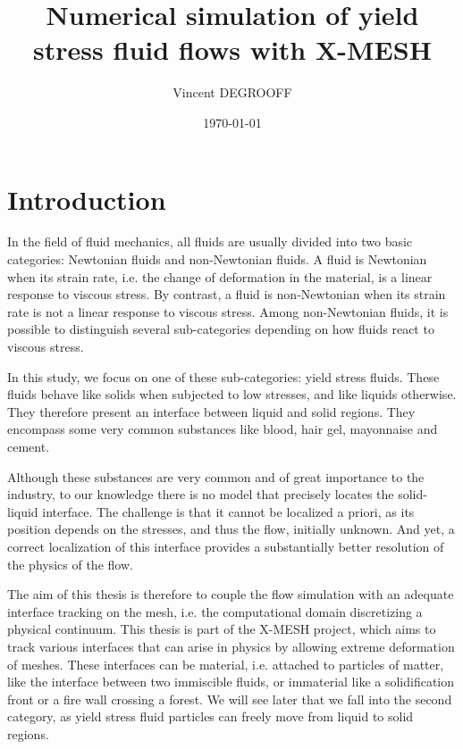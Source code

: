 \documentclass[11 pt]{report}
\title{{\Huge Numerical simulation of yield stress fluid flows with X-MESH}}
\author{Vincent \textsc{DEGROOFF}}
\date{\today}
\begin{document}
 


\setcounter{tocdepth}{1}
\tableofcontents
\setcounter{page}{1}





\clearpage
{}
\chapter*{Introduction}
In the field of fluid mechanics, all fluids are usually divided into two basic categories: Newtonian fluids and non-Newtonian fluids. A fluid is Newtonian when its strain rate, i.e. the change of deformation in the material, is a linear response to viscous stress. By contrast, a fluid is non-Newtonian when its strain rate is not a linear response to viscous stress. Among non-Newtonian fluids, it is possible to distinguish several sub-categories depending on how fluids react to viscous stress.

In this study, we focus on one of these sub-categories: yield stress fluids. These fluids behave like solids when subjected to low stresses, and like liquids otherwise. They therefore present an interface between liquid and solid regions. They encompass some very common substances like blood, hair gel, mayonnaise and cement.

Although these substances are very common and of great importance to the industry, to our knowledge there is no model that precisely locates the solid-liquid interface. The challenge is that it cannot be localized a priori, as its position depends on the stresses, and thus the flow, initially unknown. And yet, a correct localization of this interface provides a substantially better resolution of the physics of the flow.

The aim of this thesis is therefore to couple the flow simulation with an adequate interface tracking on the mesh, i.e. the computational domain discretizing a physical continuum. This thesis is part of the X-MESH project, which aims to track various interfaces that can arise in physics by allowing extreme deformation of meshes. These interfaces can be material, i.e. attached to particles of matter, like the interface between two immiscible fluids, or immaterial like a solidification front or a fire wall crossing a forest. We will see later that we fall into the second category, as yield stress fluid particles can freely move from liquid to solid regions.
\end{document}

